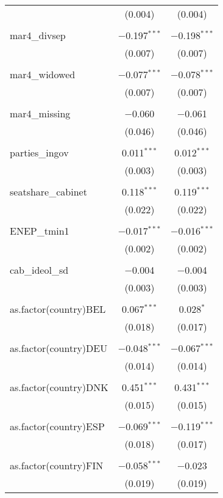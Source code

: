 \begin{table}[!htbp]
\begin{tabular}{@{\extracolsep{5pt}}lcc}
  & (0.004) & (0.004) \\ 
  & & \\ 
 mar4\_divsep & $-$0.197$^{***}$ & $-$0.198$^{***}$ \\ 
  & (0.007) & (0.007) \\ 
  & & \\ 
 mar4\_widowed & $-$0.077$^{***}$ & $-$0.078$^{***}$ \\ 
  & (0.007) & (0.007) \\ 
  & & \\ 
 mar4\_missing & $-$0.060 & $-$0.061 \\ 
  & (0.046) & (0.046) \\ 
  & & \\ 
 parties\_ingov & 0.011$^{***}$ & 0.012$^{***}$ \\ 
  & (0.003) & (0.003) \\ 
  & & \\ 
 seatshare\_cabinet & 0.118$^{***}$ & 0.119$^{***}$ \\ 
  & (0.022) & (0.022) \\ 
  & & \\ 
 ENEP\_tmin1 & $-$0.017$^{***}$ & $-$0.016$^{***}$ \\ 
  & (0.002) & (0.002) \\ 
  & & \\ 
 cab\_ideol\_sd & $-$0.004 & $-$0.004 \\ 
  & (0.003) & (0.003) \\ 
  & & \\ 
 as.factor(country)BEL & 0.067$^{***}$ & 0.028$^{*}$ \\ 
  & (0.018) & (0.017) \\ 
  & & \\ 
 as.factor(country)DEU & $-$0.048$^{***}$ & $-$0.067$^{***}$ \\ 
  & (0.014) & (0.014) \\ 
  & & \\ 
 as.factor(country)DNK & 0.451$^{***}$ & 0.431$^{***}$ \\ 
  & (0.015) & (0.015) \\ 
  & & \\ 
 as.factor(country)ESP & $-$0.069$^{***}$ & $-$0.119$^{***}$ \\ 
  & (0.018) & (0.017) \\ 
  & & \\ 
 as.factor(country)FIN & $-$0.058$^{***}$ & $-$0.023 \\ 
  & (0.019) & (0.019) \\ 

\end{tabular}
\end{table}
